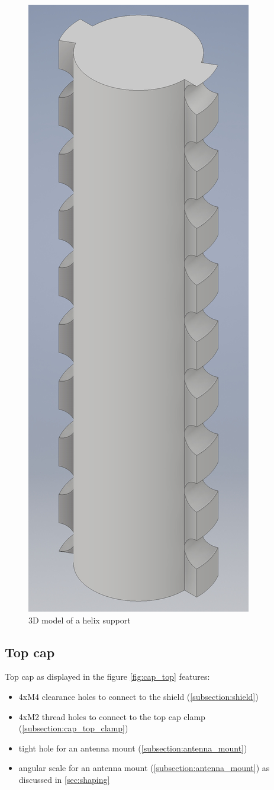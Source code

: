 \begin{figure}[h]
	\centering
	\includegraphics[width=.46\textwidth]{images/coil_support_small}
	\caption{3D model of a helix support}
	\label{fig:helix_support}
\end{figure}

\clearpage
\subsection{Top cap}
\label{subsection:cap_top}
Top cap as displayed in the figure \ref{fig:cap_top} features:
\begin{itemize}
	\item 4xM4 clearance holes to connect to the shield (\ref{subsection:shield})
	\item 4xM2 thread holes to connect to the top cap clamp (\ref{subsection:cap_top_clamp})
	\item tight hole for an antenna mount (\ref{subsection:antenna_mount})
	\item angular scale for an antenna mount (\ref{subsection:antenna_mount}) as discussed in \ref{sec:shaping}
\end{itemize}

